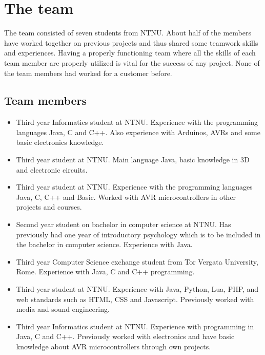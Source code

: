 \section{The team}
The team consisted of seven students from NTNU. About half of the members have worked
together on previous projects and thus shared some teamwork skills and experiences.
Having a properly functioning team where all the skills of each team member are properly
utilized is vital for the success of any project. None of the team members had 
worked for a customer before.

\subsection{Team members}

\begin{itemize}
\item{\anders}\newline
Third year Informatics student at NTNU. Experience with the programming languages Java,
C and C++. Also experience with Arduinos, AVRs and some basic electronics knowledge.

\item{\henrik}\newline
Third year student at NTNU. Main language Java, basic knowledge in 3D and electronic circuits.

\item{\johan}\newline
Third year student at NTNU. Experience with the programming languages Java, C, C++  and
Basic. Worked with AVR microcontrollers in other projects and courses.

\item{\asbjorn}\newline
Second year student on bachelor in computer science at NTNU. Has previously had one year of
introductory psychology which is to be included in the bachelor in computer science.
Experience with Java.

\item{\emanuele}\newline
Third year Computer Science exchange student from Tor Vergata University, Rome.
Experience with Java, C and C++ programming.

\item{\jonas}\newline
Third year student at NTNU. Experience with Java, Python, Lua, PHP, and web standards such as HTML,
CSS and Javascript. Previously worked with media and sound engineering.

\item{\bjornar}\newline
Third year Informatics student at NTNU. Experience with programming in Java, C and C++.
Previously worked with electronics and have basic knowledge about AVR microcontrollers through
own projects.
\end{itemize}

